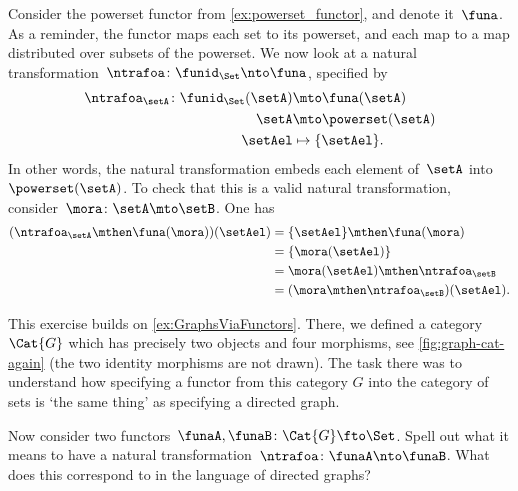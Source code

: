 \begin{example}
    Consider the powerset functor from \cref{ex:powerset_functor}, and denote it~$\funa$.
    As a reminder, the functor maps each set to its powerset, and each map to a map distributed over subsets of the powerset.
    We now look at a natural transformation~$\ntrafoa\colon \funid_\Set \nto \funa$, specified by
    \begin{equation*}
        \begin{aligned}
            \ntrafoa_\setA\colon \funid_\Set(\setA) &\mto \funa(\setA)\\
            \setA&\mto \powerset(\setA)\\
            \setAel &\mapsto \{\setAel\}.
        \end{aligned}
    \end{equation*}
    In other words, the natural transformation embeds each element of~$\setA$ into~$\powerset(\setA)$.
    To check that this is a valid natural transformation, consider~$\mora\colon \setA\mto \setB$. One has
    \begin{equation*}
        \begin{aligned}
        (\ntrafoa_\setA \mthen \funa(\mora))(\setAel)
            &=\{\setAel\} \mthen \funa(\mora)\\
            &=\{\mora(\setAel)\}\\
            &=\mora(\setAel)\mthen \ntrafoa_\setB\\
            &=(\mora \mthen \ntrafoa_\setB)(\setAel).
        \end{aligned}
    \end{equation*}
\end{example}


\begin{gradedexercise}
    \label{ex:NatTrafosGraphs}
    This exercise builds on \cref{ex:GraphsViaFunctors}.
    There, we defined a category~$\Cat{G}$ which has precisely two objects and four morphisms, see \cref{fig:graph-cat-again} (the two identity morphisms are not drawn). The task there was to understand how specifying a functor from this category $G$ into the category of sets is `the same thing' as specifying a directed graph.

    Now consider two functors~$\funaA, \funaB \colon \Cat{G} \fto \Set$. Spell out what it means to have a natural transformation~$\ntrafoa\colon \funaA \nto \funaB$. What does this correspond to in the language of directed graphs?
\end{gradedexercise}

